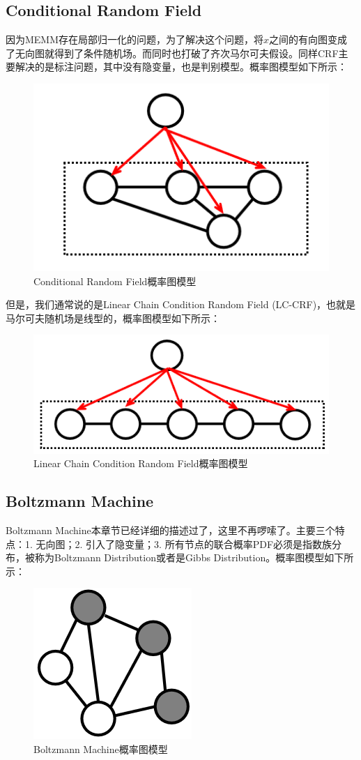 \documentclass[a4paper]{article}
\begin{document}
\subsection{Conditional Random Field}
因为MEMM存在局部归一化的问题，为了解决这个问题，将$x$之间的有向图变成了无向图就得到了条件随机场。而同时也打破了齐次马尔可夫假设。同样CRF主要解决的是标注问题，其中没有隐变量，也是判别模型。概率图模型如下所示：
\begin{figure}[H]
    \centering
    \includegraphics[width=.35\textwidth]{微信图片_20200229221504.png}
    \caption{Conditional Random Field概率图模型}
    \label{fig:my_label_1}
\end{figure}
但是，我们通常说的是Linear Chain Condition Random Field (LC-CRF)，也就是马尔可夫随机场是线型的，概率图模型如下所示：
\begin{figure}[H]
    \centering
    \includegraphics[width=.35\textwidth]{微信图片_20200229222221.png}
    \caption{Linear Chain Condition Random Field概率图模型}
    \label{fig:my_label_1}
\end{figure}
\subsection{Boltzmann Machine}
Boltzmann Machine本章节已经详细的描述过了，这里不再啰嗦了。主要三个特点：1. 无向图；2. 引入了隐变量；3. 所有节点的联合概率PDF必须是指数族分布，被称为Boltzmann Distribution或者是Gibbs Distribution。概率图模型如下所示：
\begin{figure}[H]
    \centering
    \includegraphics[width=.2\textwidth]{微信图片_20200228220817.png}
    \caption{Boltzmann Machine概率图模型}
    \label{fig:my_label_1}
\end{figure}
\end{document}
